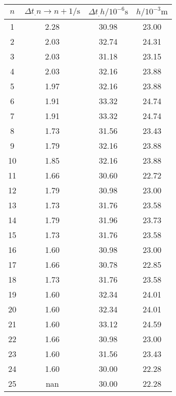 \label{tab:tabTMScan}
	\begin{tabular}{S[table-format=1.0]S[table-format=1.2]S[table-format=2.2]S[table-format=2.2]}
		\toprule
		{$n$} & {$\Delta t_.{n\rightarrow n+1}/\si{\second}$} &{$\Delta t_.{h}/10^{-6}\si{\second}$} & {$h/10^{-3}\si{\metre}$} \\
		 & 2.28 & 30.98 & 23.00 \\
		2 & 2.03 & 32.74 & 24.31 \\
		3 & 2.03 & 31.18 & 23.15 \\
		4 & 2.03 & 32.16 & 23.88 \\
		5 & 1.97 & 32.16 & 23.88 \\
		6 & 1.91 & 33.32 & 24.74 \\
		7 & 1.91 & 33.32 & 24.74 \\
		8 & 1.73 & 31.56 & 23.43 \\
		9 & 1.79 & 32.16 & 23.88 \\
		10 & 1.85 & 32.16 & 23.88 \\
		11 & 1.66 & 30.60 & 22.72 \\
		12 & 1.79 & 30.98 & 23.00 \\
		13 & 1.73 & 31.76 & 23.58 \\
		14 & 1.79 & 31.96 & 23.73 \\
		15 & 1.73 & 31.76 & 23.58 \\
		16 & 1.60 & 30.98 & 23.00 \\
		17 & 1.66 & 30.78 & 22.85 \\
		18 & 1.73 & 31.76 & 23.58 \\
		19 & 1.60 & 32.34 & 24.01 \\
		20 & 1.60 & 32.34 & 24.01 \\
		21 & 1.60 & 33.12 & 24.59 \\
		22 & 1.66 & 30.98 & 23.00 \\
		23 & 1.60 & 31.56 & 23.43 \\
		24 & 1.60 & 30.00 & 22.28 \\
		25 & nan & 30.00 & 22.28 \\
		\bottomrule
	\end{tabular}
